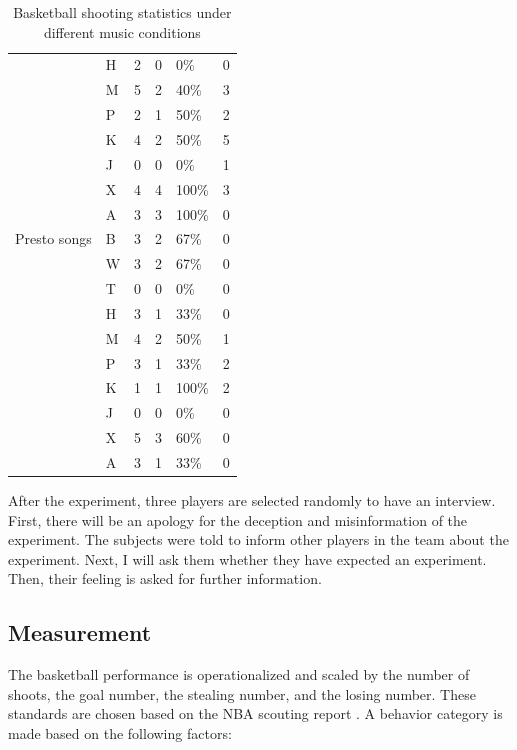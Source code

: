 \documentclass[man,floatsintext]{apa7}
\begin{document}
\begin{table}[h]
\begin{tabular}{@{}llllll@{}}
                       & H & 2 & 0 & 0\% & 0 \\
                       & M & 5 & 2 & 40\% & 3 \\
                       & P & 2 & 1 & 50\% & 2 \\
                       & K & 4 & 2 & 50\% & 5 \\
                       & J & 0 & 0 & 0\% & 1 \\
                       & X & 4 & 4 & 100\% & 3 \\
                       & A & 3 & 3 & 100\% & 0 \\
        \midrule
        Presto songs & B & 3 & 2 & 67\% & 0 \\
                     & W & 3 & 2 & 67\% & 0 \\
                     & T & 0 & 0 & 0\% & 0 \\
                     & H & 3 & 1 & 33\% & 0 \\
                     & M & 4 & 2 & 50\% & 1 \\
                     & P & 3 & 1 & 33\% & 2 \\
                     & K & 1 & 1 & 100\% & 2 \\
                     & J & 0 & 0 & 0\% & 0 \\
                     & X & 5 & 3 & 60\% & 0 \\
                     & A & 3 & 1 & 33\% & 0 \\
        \bottomrule
    \end{tabular}
    \caption{Basketball shooting statistics under different music conditions}
    \label{basketballtable}
\end{table}

After the experiment, three players are selected randomly to have an interview. First, there will be an apology for the deception and misinformation of the experiment. The subjects were told to inform other players in the team about the experiment. Next, I will ask them whether they have expected an experiment. Then, their feeling is asked for further information.

\subsection{Measurement}
The basketball performance is operationalized and scaled by the number of shoots, the goal number, the stealing number, and the losing number. These standards are chosen based on the NBA scouting report \autocite{NBAZhongGuoGuanFangWangZhanQiuYuanZiLiao2024}. A behavior category is made based on the following factors:
\end{document}
